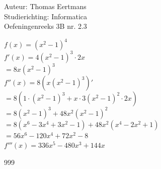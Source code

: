 \documentclass[a4paper]{article}
\begin{document}
  
\noindent \large Auteur: Thomas Eertmans \\
\noindent \large Studierichting: Informatica\\
\noindent \large Oefeningenreeks 3B nr. 2.3\\

\medskip

\normalsize

$f(x) = (x^2-1)^4$ \\

$f'(x) = 4(x^2-1)^3 \cdot 2x$ \\

$= 8x(x^2-1)^3$ \\


$f''(x) = 8(x(x^2-1)^3)'$ \\

$= 8(1 \cdot (x^2-1)^3 + x \cdot 3(x^2-1)^2 \cdot 2x)$ \\

$= 8(x^2-1)^3 + 48x^2(x^2-1)^2$ \\

$= 8(x^6 - 3x^4 + 3x^2 - 1) + 48x^2(x^4 - 2x^2 + 1)$ \\

$= 56x^6 -120x^4 + 72x^2 - 8$ \\

$f'''(x) = 336x^5 - 480x^3 + 144x$

\begin{thebibliography}{999}
\end{thebibliography}
\end{document}
